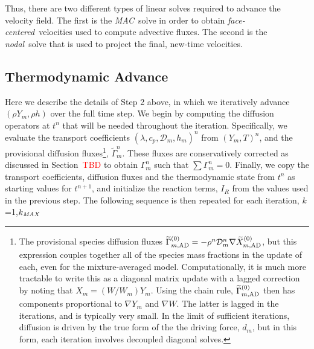 Thus, there are two different types of linear solves required to advance the velocity field.  The first is the \textit{MAC}\ solve in order to obtain \textit{face-centered}\ velocities used to compute advective fluxes.  The second is the \textit{nodal}\ solve that is used to project the final, new-time velocities.

\subsection{Thermodynamic Advance}\label{sec:Thermodynamic Advance}
Here we describe the details of Step 2 above, in
which we iteratively advance $(\rho Y_m,\rho h)$ over the full time step.
We begin by computing the diffusion
operators at $t^n$ that will be needed throughout the iteration.  Specifically, we evaluate the transport coefficients
$(\lambda,c_p,\mathcal D_m,h_m)^n$ from $(Y_m,T)^n$, and the provisional diffusion
fluxes\footnote{The provisional species diffusion fluxes $\widetilde\Gamma_{m,{\rm AD}}^{(0)} = -\rho^n\mathcal D_m^n\nabla\widetilde X_{m,{\rm AD}}^{(0)}$, but this expression couples together all of the species mass fractions in the update of each, even for the mixture-averaged model. Computationally, it is much more tractable to write this as a diagonal matrix update with a lagged correction by noting that $X_m = (W/W_m)Y_m$.  Using the chain rule, $\widetilde\Gamma_{m,{\rm AD}}^{(0)}$ then has components proportional to $\nabla Y_m$ and $\nabla W$. The latter is lagged in the iterations, and is typically very small. In the limit of sufficient iterations, diffusion is driven by the true form of the the driving force, $d_m$, but in this form, each iteration involves decoupled diagonal solves.}, $\widetilde\Gamma_m^n$.  These fluxes are conservatively
corrected as discussed in Section~\textcolor{red}{TBD} to obtain $\Gamma_m^n$ such that $\sum \Gamma_m^n = 0$.
Finally, we copy the transport coefficients, diffusion fluxes and the thermodynamic state from $t^n$ as starting values for
$t^{n+1}$, and initialize the reaction terms, $I_R$ from the values used in the previous step.
The following sequence is then repeated for each iteration, $k$=1,$k_{\it MAX}$


